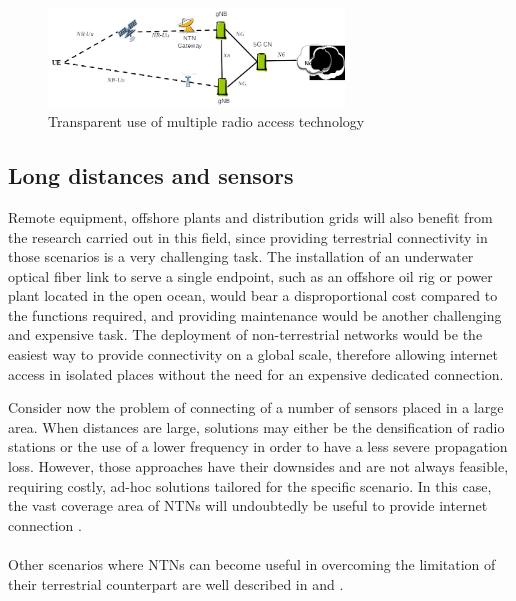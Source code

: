 \begin{figure}[ht]
    \centering
    \includegraphics[width=0.7\textwidth]{res/multiple-connectivity.png}
    \caption{Transparent use of multiple radio access technology \cite{3gpp-tr-38.811}}
    \label{fig:multiple-connectivity}
\end{figure}

\subsection{Long distances and sensors}
Remote equipment, offshore plants and distribution grids will also benefit from the research carried out in this field, since providing terrestrial connectivity in those scenarios is a very challenging task. The installation of an underwater optical fiber link to serve a single endpoint, such as an offshore oil rig or power plant located in the open ocean, would bear a disproportional cost compared to the functions required, and providing maintenance would be another challenging and expensive task. 
The deployment of non-terrestrial networks would be the easiest way to provide connectivity on a global scale, therefore allowing internet access in isolated places without the need for an expensive dedicated connection.

Consider now the problem of connecting of a number of sensors placed in a large area. When distances are large, solutions may either be the densification of radio stations or the use of a lower frequency in order to have a less severe propagation loss. However, those approaches have their downsides and are not always feasible, requiring costly, ad-hoc solutions tailored for the specific scenario. In this case, the vast coverage area of \ac{NTNs} will undoubtedly be useful to provide internet connection \cite{performance-ntn-support-iot-wang}.

\paragraph{} Other scenarios where \ac{NTNs} can become useful in overcoming the limitation of their terrestrial counterpart are well described in \cite{ntn-6g-era-challenges-giordani} and \cite{potential-multilayered-nierarchical-ntn-wang}.

